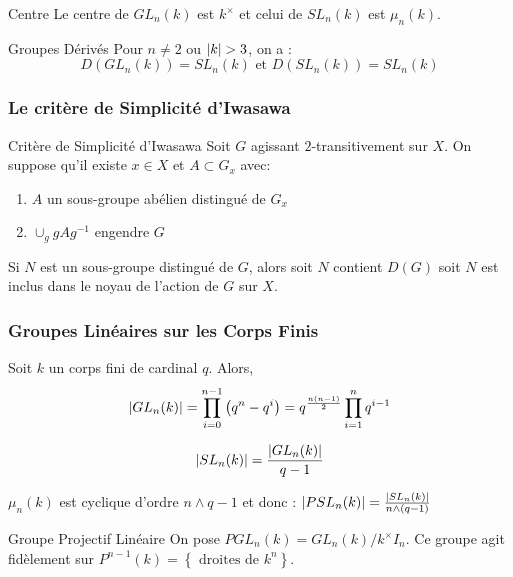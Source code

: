 \documentclass{cours}
\begin{document}
\begin{corollaire}
    {Centre}{}
    Le centre de $GL_{n}(k)$ est $k^{\times}$ et celui de $SL_{n}(k)$ est $\mu_{n}(k)$.
\end{corollaire}

\begin{propositionfr}
    {Groupes Dérivés}{}
    Pour $n \neq 2$ ou $\left|k\right| > 3$, on a : 
    \[
        D(GL_{n}(k)) = SL_{n}(k) \text{ et } D(SL_{n}(k)) = SL_{n}(k)
    \]
\end{propositionfr}

\subsubsection{Le critère de Simplicité d'Iwasawa}
\begin{propositionfr}
    {Critère de Simplicité d'Iwasawa}{}
    Soit $G$ agissant $2$-transitivement sur $X$. On suppose qu'il existe $x \in X$ et $A \subset G_x$ avec:
    \begin{enumerate}
        \item $A$ un sous-groupe abélien distingué de $G_x$
        \item $\cup_{g}gAg^{-1}$ engendre $G$
    \end{enumerate}
    Si $N$ est un sous-groupe distingué de $G$, alors soit $N$ contient $D(G)$ soit $N$ est inclus dans le noyau de l'action de $G$ sur $X$.
\end{propositionfr}


\subsubsection{Groupes Linéaires sur les Corps Finis}
\begin{lemma}
    Soit $k$ un corps fini de cardinal $q$. Alors,
    \[
        \left|GL_{n}(k)\right| = \prod_{i = 0}^{n - 1} \left(q^{n} - q^{i}\right) = q^{\frac{n(n-1)}{2}}\prod_{i = 1}^{n}q^{i - 1}
    \]
\end{lemma}
\begin{corollaire}{}{}
    \[\left|SL_{n}(k)\right| = \frac{\left|GL_{n}(k)\right|}{q - 1}\]
\end{corollaire}
\begin{corollaire}{}{}
    $\mu_{n}(k)$ est cyclique d'ordre $n \wedge q - 1$ et donc : $\left|PSL_{n}(k)\right| = \frac{\left|SL_{n}(k)\right|}{n \wedge (q - 1)}$
\end{corollaire}

\begin{définition}{Groupe Projectif Linéaire}{}
    On pose $PGL_{n}(k) = GL_{n}(k)/k^{\times}I_{n}$. Ce groupe agit fidèlement sur $P^{n - 1}(k) = \left\{\text{ droites de } k^{n}\right\}$.
\end{définition}
\end{document}
